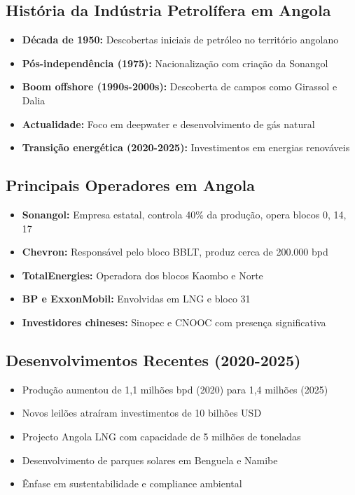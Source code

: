 \documentclass[12pt]{article}
\begin{document}
\subsection{História da Indústria Petrolífera em Angola}

\begin{itemize}
    \item \textbf{Década de 1950:} Descobertas iniciais de petróleo no território angolano
    \item \textbf{Pós-independência (1975):} Nacionalização com criação da Sonangol
    \item \textbf{Boom offshore (1990s-2000s):} Descoberta de campos como Girassol e Dalia
    \item \textbf{Actualidade:} Foco em deepwater e desenvolvimento de gás natural
    \item \textbf{Transição energética (2020-2025):} Investimentos em energias renováveis
\end{itemize}

\subsection{Principais Operadores em Angola}

\begin{itemize}
    \item \textbf{Sonangol:} Empresa estatal, controla 40\% da produção, opera blocos 0, 14, 17
    \item \textbf{Chevron:} Responsável pelo bloco BBLT, produz cerca de 200.000 bpd
    \item \textbf{TotalEnergies:} Operadora dos blocos Kaombo e Norte
    \item \textbf{BP e ExxonMobil:} Envolvidas em LNG e bloco 31
    \item \textbf{Investidores chineses:} Sinopec e CNOOC com presença significativa
\end{itemize}

\subsection{Desenvolvimentos Recentes (2020-2025)}

\begin{itemize}
    \item Produção aumentou de 1,1 milhões bpd (2020) para 1,4 milhões (2025)
    \item Novos leilões atraíram investimentos de 10 bilhões USD
    \item Projecto Angola LNG com capacidade de 5 milhões de toneladas
    \item Desenvolvimento de parques solares em Benguela e Namibe
    \item Ênfase em sustentabilidade e compliance ambiental
\end{itemize}
\end{document}
